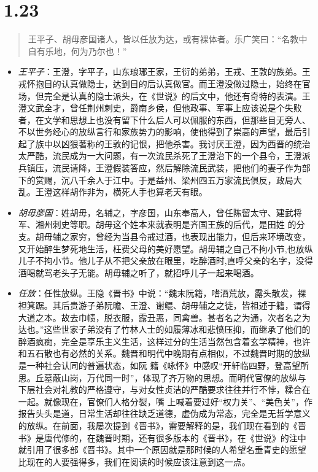 \documentclass[]{book}
\providecommand{\tightlist}{%
  \setlength{\itemsep}{0pt}\setlength{\parskip}{0pt}}
\begin{document}
\section{1.23}\label{section-22}

\begin{quote}
王平子、胡毋彦国诸人，皆以任放为达，或有裸体者。乐广笑曰：``名教中自有乐地，何为乃尔也！''
\end{quote}

\begin{itemize}
\tightlist
\item
  \emph{王平子}：王澄，字平子，山东琅琊王家，王衍的弟弟，王戎、王敦的族弟。王戎怀抱目的认真做隐士，达到目的后认真做官。而王澄没做过隐士，始终在官场，但完全是认真的隐士派头，在《世说》的后文中，他还有奇特的表演。王澄文武全才，曾任荆州刺史，爵南乡侯，但他政事、军事上应该说是个失败者，在文学和思想上也没有留下什么后人可以佩服的东西，但那些目无旁人、不以世务经心的放纵言行和家族势力的影响，使他得到了崇高的声望，最后引起了族中以凶狠著称的王敦的记恨，把他杀害。我讨厌王澄，因为西晋的统治太严酷，流民成为一大问题，有一次流民杀死了王澄治下的一个县令，王澄派兵镇压，流民请降，王澄假装答应，然后解除流民武装，把他们的妻子作为部下的赏赐，沉八千余人于江中。于是益州、梁州四五万家流民俱反，政局大乱。王澄这样胡作非为，横死人手也算老天有眼。
\item
  \emph{胡毋彦国}：姓胡毋，名辅之，字彦国，山东奉高人，曾任陈留太守、建武将军、湘州刺史等职。胡毋这个姓本来就表明是齐国王族的后代，是田姓
  的分支。胡毋辅之家穷，曾经为当县令戒过酒，也表现出能力，但后来环境改变，又开始醉生梦死地生活，枉费父母的美好愿望。胡毋辅之自己不拘小节,也放纵儿子不拘小节。他儿子从不把父亲放在眼里，吃醉酒时,直呼父亲的名字，没得酒喝就骂老头子无能。胡毋辅之听了，就招呼儿子一起来喝酒。
\item
  \emph{任放}：任性放纵。王隐《晋书》中说：``魏末阮籍，嗜酒荒放，露头散发，裸袒箕踞。其后贵游子弟阮瞻、王澄、谢鲲、胡毋辅之之徒，皆祖述于籍，谓得大道之本。故去巾帻，脱衣服，露丑恶，同禽兽。甚者名之为通，次者名之为达也。''这些世家子弟没有了竹林人士的如履薄冰和悲愤压抑，而继承了他们的醉酒疯痴，完全是享乐主义生活，这样过分的生活当然包含着玄学精神，也许和五石散也有必然的关系。魏晋和明代中晚期有点相似，不过魏晋时期的放纵是一种社会认同的普遍状态，如阮
  籍《咏怀》中感叹``开轩临四野，登高望所思。丘墓蔽山岗，万代同一时''，体现了齐万物的思想。而明代官僚的放纵与下层社会对礼教的严格遵守，与对女性贞洁的严酷要求往往并行不悖，糅合在一起。就像现在，官僚们人格分裂，嘴
  上喊着要过好``权力关''、``美色关''，作报告头头是道，日常生活却往往缺乏道德，虚伪成为常态，完全是无哲学意义的放纵。在前面，我屡次提到《晋书》，需要解释的是，我们现在看到的《晋书》是唐代修的，在魏晋时期，还有很多版本的《晋书》，在《世说》的注中就引用了很多部《晋书》。其中一个原因就是那时候的人希望名垂青史的愿望比现在的人要强得多，我们在阅读的时候应该注意到这一点。

\end{itemize}
\end{document}
